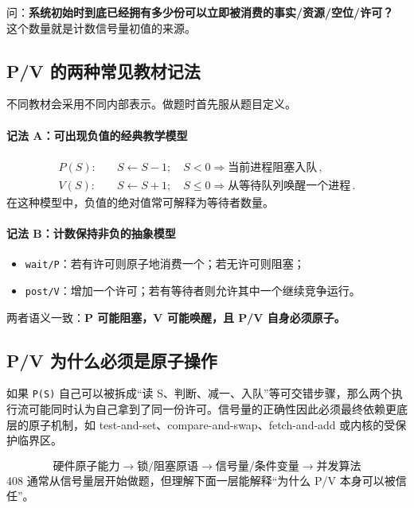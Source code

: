 \documentclass[11pt,a4paper]{ctexart}
\newcommand{\kw}[1]{\textbf{#1}}
\newcommand{\code}[1]{\texttt{#1}}
\begin{document}
\begin{corebox}[初值不是背出来的]
问：\kw{系统初始时到底已经拥有多少份可以立即被消费的事实/资源/空位/许可？} 这个数量就是计数信号量初值的来源。
\end{corebox}

\subsection{P/V 的两种常见教材记法}

不同教材会采用不同内部表示。做题时首先服从题目定义。

\paragraph{记法 A：可出现负值的经典教学模型}
\begin{align*}
P(S):&\quad S\leftarrow S-1;\quad S<0\Rightarrow\text{当前进程阻塞入队}\,,\\
V(S):&\quad S\leftarrow S+1;\quad S\le 0\Rightarrow\text{从等待队列唤醒一个进程}\,.
\end{align*}
在这种模型中，负值的绝对值常可解释为等待者数量。

\paragraph{记法 B：计数保持非负的抽象模型}
\begin{itemize}
\item \code{wait/P}：若有许可则原子地消费一个；若无许可则阻塞；
\item \code{post/V}：增加一个许可；若有等待者则允许其中一个继续竞争运行。
\end{itemize}

两者语义一致：\kw{P 可能阻塞，V 可能唤醒，且 P/V 自身必须原子。}

\subsection{P/V 为什么必须是原子操作}

如果 \code{P(S)} 自己可以被拆成“读 S、判断、减一、入队”等可交错步骤，那么两个执行流可能同时认为自己拿到了同一份许可。信号量的正确性因此必须最终依赖更底层的原子机制，如 test-and-set、compare-and-swap、fetch-and-add 或内核的受保护临界区。

\begin{pattern}[抽象层次]
\[
\boxed{
\text{硬件原子能力}
\to\text{锁/阻塞原语}
\to\text{信号量/条件变量}
\to\text{并发算法}
}
\]
408 通常从信号量层开始做题，但理解下面一层能解释“为什么 P/V 本身可以被信任”。
\end{pattern}
\end{document}
